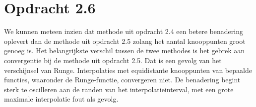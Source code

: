 \documentclass[a4paper]{article}
\begin{document}
\section*{Opdracht 2.6}
We kunnen meteen inzien dat methode uit opdracht 2.4 een betere benadering oplevert dan de  methode uit opdracht 2.5 zolang het aantal knooppunten groot genoeg is. Het belangrijkste verschil tussen de twee methodes is het gebrek aan convergentie bij de methode uit opdracht 2.5. Dat is een gevolg van het verschijnsel van Runge. Interpolaties met equidistante knooppunten van bepaalde functies, waaronder de Runge-functie, convergeren niet. De benadering begint sterk te oscilleren aan de randen van het interpolatieinterval, met een grote maximale interpolatie fout als gevolg.
\end{document}
